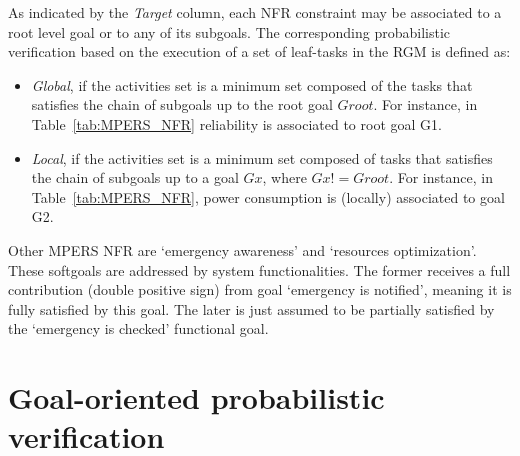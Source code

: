 
As indicated by the \textit{Target} column, each NFR constraint may be associated to a root level goal or to any of its subgoals. The corresponding probabilistic verification based on the execution of a set of leaf-tasks in the RGM is defined as:

\begin{itemize}

\item \textit{Global}, if the activities set is a minimum set composed of the tasks that satisfies the chain of subgoals up to the root goal $Groot$. For instance, in Table~\ref{tab:MPERS_NFR} reliability is associated to root goal G1.
\medskip

\item \textit{Local}, if the activities set is a minimum set composed of tasks that satisfies the chain of subgoals up to a goal $Gx$, where $Gx != Groot$. For instance, in Table~\ref{tab:MPERS_NFR}, power consumption is (locally) associated to goal G2.
\medskip

\end{itemize}


Other MPERS NFR are `emergency awareness' and `resources optimization'. These softgoals are addressed by system functionalities. The former receives a full contribution (double positive sign) from goal `emergency is notified', meaning it is fully satisfied by this goal. The later is just assumed to be partially satisfied by the `emergency is checked' functional goal.

\section{Goal-oriented probabilistic verification}\label{ssec:NFR-verification}


